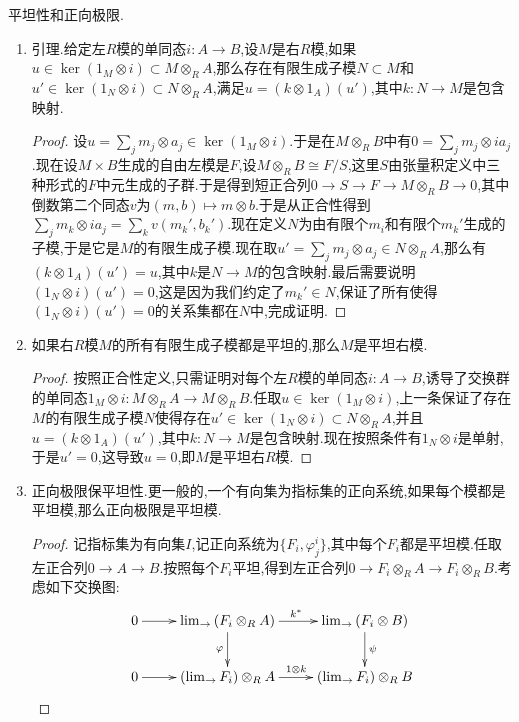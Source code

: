 平坦性和正向极限.
\begin{enumerate}
	\item 引理.给定左$R$模的单同态$i:A\to B$,设$M$是右$R$模,如果$u\in\ker(1_M\otimes i)\subset M\otimes_RA$,那么存在有限生成子模$N\subset M$和$u'\in\ker(1_N\otimes i)\subset N\otimes_RA$,满足$u=(k\otimes 1_A)(u')$,其中$k:N\to M$是包含映射.
	\begin{proof}
		
		设$u=\sum_jm_j\otimes a_j\in\ker(1_M\otimes i)$.于是在$M\otimes_RB$中有$0=\sum_jm_j\otimes ia_j$.现在设$M\times B$生成的自由左模是$F$,设$M\otimes_RB\cong F/S$,这里$S$由张量积定义中三种形式的$F$中元生成的子群.于是得到短正合列$0\to S\to F\to M\otimes_RB\to0$,其中倒数第二个同态$v$为$(m,b)\mapsto m\otimes b$.于是从正合性得到$\sum_jm_k\otimes ia_j=\sum_kv(m_k',b_k')$.现在定义$N$为由有限个$m_i$和有限个$m_k'$生成的子模,于是它是$M$的有限生成子模.现在取$u'=\sum_jm_j\otimes a_j\in N\otimes_RA$,那么有$(k\otimes1_A)(u')=u$,其中$k$是$N\to M$的包含映射.最后需要说明$(1_N\otimes i)(u')=0$,这是因为我们约定了$m_k'\in N$,保证了所有使得$(1_N\otimes i)(u')=0$的关系集都在$N$中,完成证明.	
	\end{proof}
    \item 如果右$R$模$M$的所有有限生成子模都是平坦的,那么$M$是平坦右模.
    \begin{proof}
    	
    	按照正合性定义,只需证明对每个左$R$模的单同态$i:A\to B$,诱导了交换群的单同态$1_M\otimes i:M\otimes_RA\to M\otimes_RB$.任取$u\in\ker(1_M\otimes i)$,上一条保证了存在$M$的有限生成子模$N$使得存在$u'\in\ker(1_N\otimes i)\subset N\otimes_RA$,并且$u=(k\otimes1_A)(u')$,其中$k:N\to M$是包含映射.现在按照条件有$1_N\otimes i$是单射,于是$u'=0$,这导致$u=0$,即$M$是平坦右$R$模.
    \end{proof}
    \item 正向极限保平坦性.更一般的,一个有向集为指标集的正向系统,如果每个模都是平坦模,那么正向极限是平坦模.
    \begin{proof}
    	
    	记指标集为有向集$I$,记正向系统为$\{F_i,\varphi_j^i\}$,其中每个$F_i$都是平坦模.任取左正合列$0\to A\to B$.按照每个$F_i$平坦,得到左正合列$0\to F_i\otimes_RA\to F_i\otimes_RB$.考虑如下交换图:
    	$$\xymatrix{
    		0\ar[r]&\lim_{\rightarrow}\left(F_i\otimes_RA\right)\ar[r]^{k^*}\ar[d]_{\varphi}&\lim_{\rightarrow}\left(F_i\otimes B\right)\ar[d]^{\psi}\\
    		0\ar[r]&\left(\lim_{\rightarrow}F_i\right)\otimes_RA\ar[r]^{1\otimes k}&\left(\lim_{\rightarrow}F_i\right)\otimes_RB
    	}$$
    	

\end{proof}
\end{enumerate}
